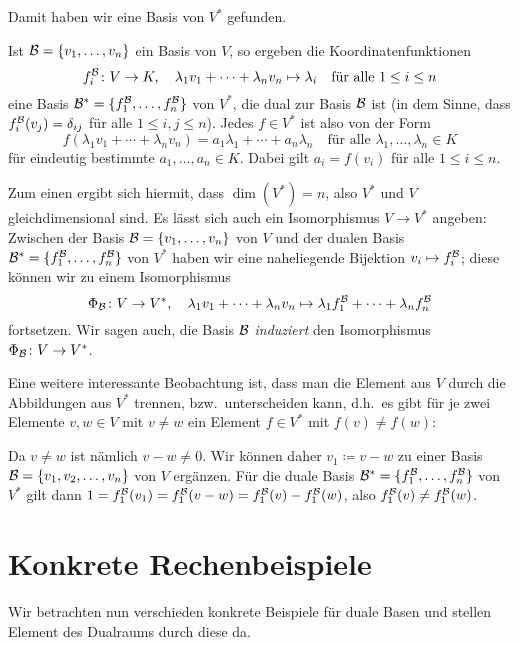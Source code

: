 \documentclass[a4paper,10pt]{article}
\begin{document}
Damit haben wir eine Basis von $V^*$ gefunden.

\begin{shaded}
 Ist $\mathcal{B} = \{v_1, \dotsc, v_n\}$ ein Basis von $V$, so ergeben die Koordinatenfunktionen
 \[
  f^{\mathcal{B}}_i \colon V \to K, \quad \lambda_1 v_1 + \dotsb + \lambda_n v_n \mapsto \lambda_i
  \quad
  \text{für alle $1 \leq i \leq n$}
 \]
 eine Basis $\mathcal{B}^* = \{f^{\mathcal{B}}_1, \dotsc, f^{\mathcal{B}}_n\}$ von $V^*$, die dual zur Basis $\mathcal{B}$ ist (in dem Sinne, dass $f^{\mathcal{B}}_i(v_j) = \delta_{ij}$ für alle $1 \leq i,j \leq n$). Jedes $f \in V^*$ ist also von der Form
 \[
  f(\lambda_1 v_1 + \dotsb + \lambda_n v_n)
  = a_1 \lambda_1 + \dotsb + a_n \lambda_n
  \quad
  \text{für alle $\lambda_1, \dotsc, \lambda_n \in K$}
 \]
 für eindeutig bestimmte $a_1, \dotsc, a_n \in K$. Dabei gilt $a_i = f(v_i)$ für alle $1 \leq i \leq n$.
\end{shaded}

Zum einen ergibt sich hiermit, dass $\dim(V^*) = n$, also $V^*$ und $V$ gleichdimensional sind. Es lässt sich auch ein Isomorphismus $V \to V^*$ angeben: Zwischen der Basis $\mathcal{B} = \{v_1, \dotsc, v_n\}$ von $V$ und der dualen Basis $\mathcal{B}^* = \{f^{\mathcal{B}}_1, \dotsc, f^{\mathcal{B}}_n\}$ von $V^*$ haben wir eine naheliegende Bijektion $v_i \mapsto f^{\mathcal{B}}_i$; diese können wir zu einem Isomorphismus
\[
 \Phi_{\mathcal{B}} \colon V \to V^*,
 \quad
 \lambda_1 v_1 + \dotsb + \lambda_n v_n
 \mapsto
 \lambda_1 f^{\mathcal{B}}_1 + \dotsb + \lambda_n f^{\mathcal{B}}_n
\]
fortsetzen. Wir sagen auch, die Basis $\mathcal{B}$ \emph{induziert} den Isomorphismus $\Phi_{\mathcal{B}} \colon V \to V^*$.

Eine weitere interessante Beobachtung ist, dass man die Element aus $V$ durch die Abbildungen aus $V^*$ trennen, bzw.\ unterscheiden kann, d.h.\ es gibt für je zwei Elemente $v,w \in V$ mit $v \neq w$ ein Element $f \in V^*$ mit $f(v) \neq f(w)$:

Da $v \neq w$ ist nämlich $v-w \neq 0$. Wir können daher $v_1 \coloneqq v-w$ zu einer Basis $\mathcal{B} = \{v_1, v_2, \dotsc, v_n\}$ von $V$ ergänzen. Für die duale Basis $\mathcal{B}^* = \{f^{\mathcal{B}}_1, \dotsc, f^{\mathcal{B}}_n\}$ von $V^*$ gilt dann $1 = f^{\mathcal{B}}_1(v_1) = f^{\mathcal{B}}_1(v-w) = f^{\mathcal{B}}_1(v) - f^{\mathcal{B}}_1(w)$, also $f^{\mathcal{B}}_1(v) \neq f^{\mathcal{B}}_1(w)$.










\section{Konkrete Rechenbeispiele}
Wir betrachten nun verschieden konkrete Beispiele für duale Basen und stellen Element des Dualraums durch diese da.
\end{document}
